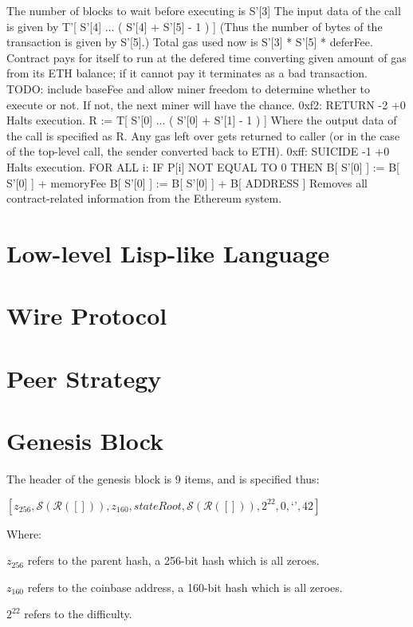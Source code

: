 \documentclass[9pt,oneside]{amsart}
\begin{document}
\begin{multicols}{2}
The number of blocks to wait before executing is S'[3]
The input data of the call is given by T'[ S'[4] ... ( S'[4] + S'[5] - 1 ) ]
(Thus the number of bytes of the transaction is given by S'[5].)
Total gas used now is S'[3] * S'[5] * deferFee.
Contract pays for itself to run at the defered time converting given amount of gas from its ETH balance; if it cannot pay it terminates as a bad transaction. TODO: include baseFee and allow miner freedom to determine whether to execute or not. If not, the next miner will have the chance.
0xf2: RETURN -2 +0
Halts execution.
R := T[ S'[0] ... ( S'[0] + S'[1] - 1 ) ]
Where the output data of the call is specified as R.
Any gas left over gets returned to caller (or in the case of the top-level call, the sender converted back to ETH).
0xff: SUICIDE -1 +0
Halts execution.
FOR ALL i: IF P[i] NOT EQUAL TO 0 THEN B[ S'[0] ] := B[ S'[0] ] + memoryFee
B[ S'[0] ] := B[ S'[0] ] + B[ ADDRESS ]
Removes all contract-related information from the Ethereum system.

\section{Low-level Lisp-like Language}\label{app:lll}

\section{Wire Protocol}\label{app:wire}

\section{Peer Strategy}\label{app:peers}

\section{Genesis Block}\label{app:genesis}

The header of the genesis block is 9 items, and is specified thus:

$[z_{256}, \mathcal{S}(\mathcal{R}([])), z_{160}, stateRoot, \mathcal{S}(\mathcal{R}([])), 2^{22}, 0, \text{`'}, 42]$

Where:

$z_{256}$ refers to the parent hash, a 256-bit hash which is all zeroes.

$z_{160}$ refers to the coinbase address, a 160-bit hash which is all zeroes.

$2^{22}$ refers to the difficulty.


\end{multicols}
\end{document}
